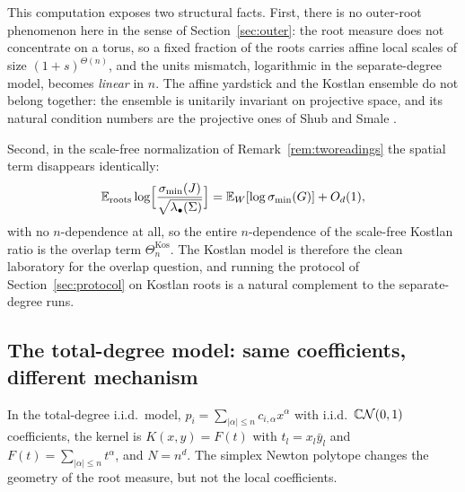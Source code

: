 This computation exposes two structural facts. First, there is no outer-root phenomenon
here in the sense of Section~\ref{sec:outer}: the root measure does not concentrate on a
torus, so a fixed fraction of the roots carries affine local scales of size
$(1+s)^{\Theta(n)}$, and the units mismatch, logarithmic in the separate-degree model,
becomes \emph{linear} in $n$. The affine yardstick and the Kostlan ensemble do not belong
together: the ensemble is unitarily invariant on projective space, and its natural
condition numbers are the projective ones of Shub and Smale \cite{shub1993complexity}.

Second, in the scale-free normalization of Remark~\ref{rem:tworeadings} the spatial term
disappears identically:
\[
  \mathbb{E}_{\mathrm{roots}}\log\Bigl[\frac{\sigma_{\min}(J)}{\sqrt{\lambda_\bullet(\Sigma)}}\Bigr]
  = \mathbb{E}_{W}[\log\sigma_{\min}(G)] + O_d(1),
\]
with no $n$-dependence at all, so the entire $n$-dependence of the scale-free Kostlan
ratio is the overlap term $\Theta_n^{\mathrm{Kos}}$. The Kostlan model is therefore the
clean laboratory for the overlap question, and running the protocol of
Section~\ref{sec:protocol} on Kostlan roots is a natural complement to the
separate-degree runs.

\subsection{The total-degree model: same coefficients, different mechanism}
\label{sec:totaldegree}

In the total-degree i.i.d.\ model, $p_i = \sum_{|\alpha|\le n}c_{i,\alpha}x^\alpha$ with
i.i.d.\ $\mathbb{C}\mathcal{N}(0,1)$ coefficients, the kernel is $K(x,y) = F(t)$ with $t_l = x_l\bar y_l$
and $F(t) = \sum_{|\alpha|\le n}t^\alpha$, and $N = n^d$. The simplex Newton polytope
changes the geometry of the root measure, but not the local coefficients.

